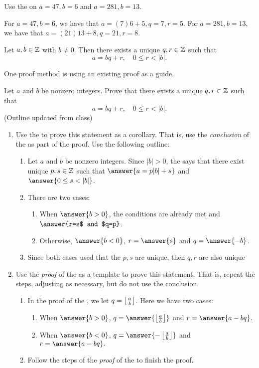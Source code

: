 \documentclass{ximera}
\begin{document}
\begin{br}
 Use the  on $a=47, b=6$ and $a=281, b=13$.
\end{br}
\begin{solution}
For $a=47, b=6$, we have that $a=(7)6+5, q=7, r=5$.
For $a=281, b=13$, we have that $a=(21)13+8, q=21, r=8$.
\end{solution}

\begin{corollary}
 Let $a,b\in\mathbb Z$ with $b\neq0$. Then there exists a unique $q,r\in\mathbb Z$ such that \[a=bq+r, \quad 0\leq r <|b|.\]
\end{corollary}
One proof method is using an existing proof as a guide.

\begin{br}  Let $a$ and $b$ be nonzero integers. Prove that there exists a unique $q,r\in\mathbb Z$ such that 
  \[a=bq+r, \quad 0\leq r <|b|.\]
(Outline updated from class)
  \begin{enumerate}
    	\item Use the  to prove this statement as a corollary. That is, use the \emph{conclusion} of the  as part of the proof.  Use the following outline:
    	\begin{enumerate}
		\item  Let $a$ and $b$ be nonzero integers. Since $|b|>0$, the  says that there exist unique $p,s\in\mathbb Z$ such that $\answer{a=p|b|+s}$ and $\answer{0\leq s<|b|}$.
      		\item There are two cases:
      		\begin{enumerate}
        			\item When $\answer{b>0}$, the conditions are already met and $\answer{r=s$ and $q=p}$.
        			\item Otherwise, $\answer{b<0}$, $r=\answer{s}$ and $q=\answer{-b}$.
      		\end{enumerate}
      		\item Since both cases used that the $p,s$ are unique, then $q,r$ are also unique
	\end{enumerate}
    	\item Use the \emph{proof} of the  as a template to prove this statement. That is, repeat the steps, adjusting as necessary, but do not use the conclusion.
    	\begin{enumerate}
    		\item In the proof of the , we let $q=\left\lfloor \frac{a}{b}\right\rfloor$. Here we have two cases:
    		\begin{enumerate}
      			\item When $\answer{b>0}$, $q=\answer{\floor{\frac{a}{b}}}$ and $r=\answer{a-bq}.$
      			\item When $\answer{b<0}$, $q=\answer{-\floor{\frac{a}{b}}}$ and $r=\answer{a-bq}.$   
		\end{enumerate}
    		\item Follow the steps of the \emph{proof} of the  to finish the proof.
    	\end{enumerate}


\end{enumerate}
\end{br}
\end{document}
